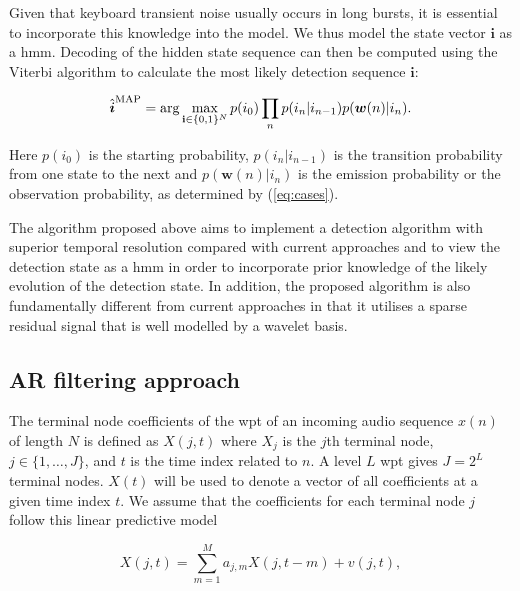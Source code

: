 Given that keyboard transient noise usually occurs in long bursts, it is essential to incorporate this knowledge into the model. We thus model the state vector $\boldsymbol{i}$ as a \DIFdelbegin {}\DIFdelend \DIFaddbegin \gls{hmm}\DIFaddend . Decoding of the hidden state sequence can then be computed using the Viterbi algorithm \cite{Viterbi1967}\cite{Forney1973} to calculate the most likely detection sequence $\boldsymbol{i}$:

\begin{equation}\label{eq:viterbi}
\hat{\boldsymbol{i}}^{\textrm{MAP}} = \arg\max_{{\bf i}\in\{0,1\}^N} p(i_{0})\prod_n p(i_n | i_{n-1})p(\boldsymbol{w}(n) | i_n).
\end{equation}

Here $p(i_{0})$ is the starting probability, $p(i_n | i_{n-1})$ is the transition probability from one state to the next and $p(\boldsymbol{w}(n) | i_n)$ is the emission probability or the observation probability, as determined by (\ref{eq:cases}).

The algorithm proposed above aims to implement a detection algorithm with superior temporal resolution compared with current approaches and to view the detection state as a \DIFdelbegin {}\DIFdelend \DIFaddbegin \gls{hmm} \DIFaddend in order to incorporate prior knowledge of the likely evolution of the detection state. In addition, the proposed algorithm is also fundamentally different from current approaches in that it utilises a sparse residual signal that is well modelled by a wavelet basis.

\subsection{AR filtering approach}\label{sec:WPdetectionAR}

The terminal node coefficients of the \DIFdelbegin {}\DIFdelend \DIFaddbegin \gls{wpt} \DIFaddend of an incoming audio sequence $x(n)$ of length $N$ is defined as $X(j,t)$ where $X_j$ is the $j$th terminal node, $j \in \{1, \ldots, J\}$, and $t$ is the time index related to $n$. A level $L$ \DIFdelbegin {}\DIFdelend \DIFaddbegin \gls{wpt} \DIFaddend gives $J = 2^L$ terminal nodes. $X(t)$ will be used to denote a vector of all coefficients at a given time index $t$. We assume that the coefficients for each terminal node $j$ follow this linear predictive model

\begin{equation}\label{eq:lpm}
X(j,t) = \sum_{m=1}^{M} a_{j,m} X(j,t - m) + v(j,t),
\end{equation}

